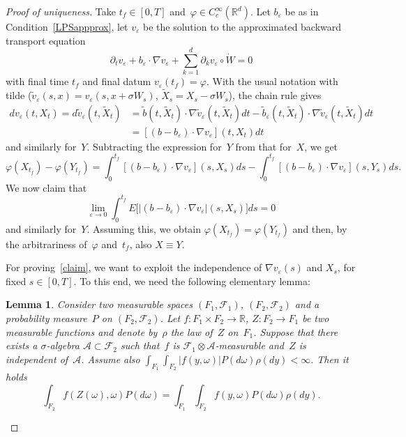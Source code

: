 \documentclass[a4paper,10pt]{article}
\newtheorem{lemma}[theorem]{Lemma}
\newcommand\1{\mathbbm{1}}
\newcommand{\mr}{\mathbb{R}}
\newcommand{\mc}{\mathcal}
\newcommand{\td}{\tilde}
\newcommand{\eps}{\varepsilon}
\numberwithin{equation}{section}
\begin{document}
\begin{proof}[Proof of uniqueness]
Take $t_f \in [0,T]$ and~$\varphi \in C^\infty_c(\mr^d)$. Let $b_\eps$ be as in Condition~\ref{LPSappprox}, let $v_\eps$ be the solution to the approximated backward transport equation
\begin{equation*}
\partial_t v_\eps +b_\eps\cdot\nabla v_\eps +\sum^d_{k=1}\partial_k v_\eps\circ\dot{W} =0
\end{equation*}
with final time $t_f$ and final datum $v_\eps(t_f)=\varphi$. With the usual notation with tilde ($\td{v}_\eps(s,x)=v_\eps(s,x+\sigma W_s)$, $\td{X}_s=X_s-\sigma W_s$), the chain rule gives
\begin{align*}
dv_\eps(t,X_t)= d\td{v}_\eps(t,\td{X}_t) & = \td{b}(t,\td{X}_t)\cdot\nabla \td{v}_\eps(t,\td{X}_t)dt -\td{b}_\eps(t,\td{X}_t)\cdot\nabla \td{v}_\eps(t,\td{X}_t)dt \\	
  & = [(b-b_\eps)\cdot\nabla v_\eps](t,X_t)dt
\end{align*}
and similarly for~$Y$. Subtracting the expression for~$Y$ from that for~$X$, we get
\begin{equation*}
\varphi(X_{t_f})-\varphi(Y_{t_f})=\int^{t_f}_0[(b-b_\eps)\cdot\nabla v_\eps](s,X_s)ds-\int^{t_f}_0[(b-b_\eps)\cdot\nabla v_\eps](s,Y_s)ds .
\end{equation*}
We now claim that
\begin{equation}
\lim_{\eps\rightarrow0}\int^{t_f}_0 E \big[ |(b-b_\eps)\cdot\nabla v_\eps|(s,X_s) \big] ds=0\label{claim}
\end{equation}
and similarly for~$Y$. Assuming this, we obtain $\varphi(X_{t_f})=\varphi(Y_{t_f})$ and then, by the arbitrariness of~$\varphi$ and~$t_f$, also $X\equiv Y$.

For proving~\eqref{claim}, we want to exploit the independence of $\nabla v_\eps(s)$ and $X_s$, for fixed $s \in [0,T]$. To this end, we need the following elementary lemma:

\begin{lemma}\label{indep}
Consider two measurable spaces $(F_1,\mc{F}_1)$, $(F_2,\mc{F}_2)$ and a probability measure~$P$ on $(F_2,\mc{F}_2)$. Let $f \colon F_1 \times F_2 \rightarrow\mr$, $Z \colon F_2\rightarrow F_1$ be two measurable functions and denote by~$\rho$ the law of~$Z$ on~$F_1$. Suppose that there exists a $\sigma$-algebra $\mc{A} \subset \mc{F}_2$ such that~$f$ is $\mc{F}_1\otimes\mc{A}$-measurable and~$Z$ is independent of~$\mc{A}$. Assume also $\int_{F_1} \int_{F_2}|f(y,\omega)|P(d\omega)\rho(dy)<\infty$. Then it holds
\begin{equation*}
\int_{F_2} f(Z(\omega),\omega) P(d\omega)=\int_{F_1} \int_{F_2} f(y,\omega) P(d\omega) \rho(dy) .
\end{equation*}
\end{lemma}


\end{proof}
\end{document}
